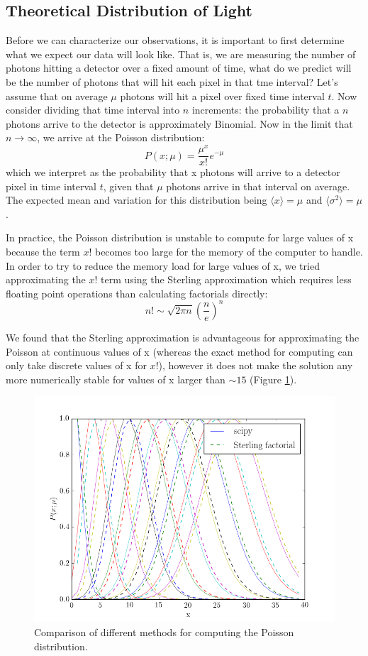 \documentclass[preprint]{aastex62}
\begin{document}
\subsection{Theoretical Distribution of Light}
Before we can characterize our observations, it is important to first determine what we expect our data will look like. That is, we are measuring the number of photons hitting a detector over a fixed amount of time, what do we predict will be the number of photons that will hit each pixel in that tme interval? Let's assume that on average $\mu$ photons will hit a pixel over fixed time interval $t$. Now consider dividing that time interval into $n$ increments: the probability that a $n$ photons arrive to the detector is approximately Binomial. Now in the limit that $n\rightarrow\infty$, we arrive at the Poisson distribution:
\begin{equation}
P(x;\mu) = \frac{\mu^x}{x!}e^{-\mu}
\end{equation}
which we interpret as the probability that x photons will arrive to a detector pixel in time interval $t$, given that $\mu$ photons arrive in that interval on average. The expected mean and variation for this distribution being $\langle x \rangle = \mu$ and $\langle \sigma^2 \rangle = \mu$.

In practice, the Poisson distribution is unstable to compute for large values of x because the term $x!$ becomes too large for the memory of the computer to handle. In order to try to reduce the memory load for large values of x, we tried approximating the $x!$ term using the Sterling approximation which requires less floating point operations than calculating factorials directly:
\begin{equation}
n! \sim \sqrt{2\pi n}\left(\frac{n}{e} \right)^n
\end{equation}

We found that the Sterling approximation is advantageous for approximating the Poisson at continuous values of x (whereas the exact method for computing can only take discrete values of x for $x!$), however it does not make the solution any more numerically stable for values of x larger than $\sim15$ (Figure \ref{fig:poisson}).

\begin{figure}[ht]
\begin{center}
\includegraphics[width=.48\linewidth]{plots/poisson_comparisons.png}
\caption{Comparison of different methods for computing the Poisson distribution.} \label{fig:poisson}
\end{center}
\end{figure}
\end{document}
